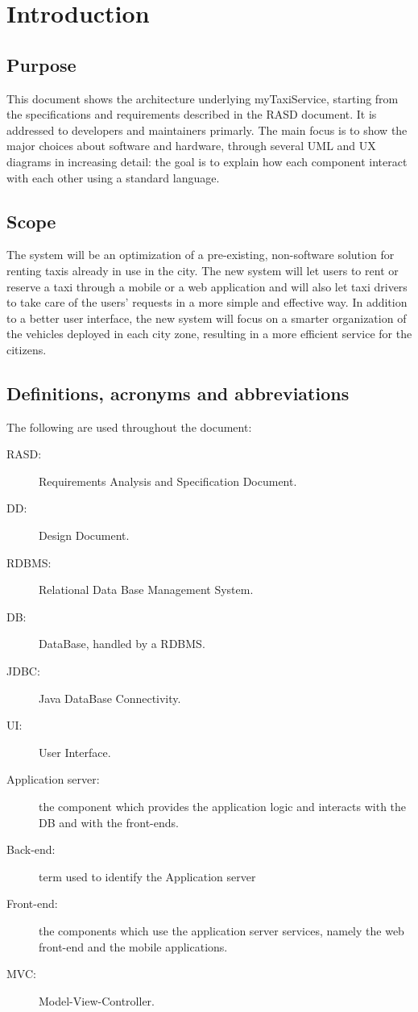 \section{Introduction}

\subsection{Purpose}
This document shows the architecture underlying myTaxiService, starting from the specifications and requirements described in the RASD document. It is addressed to developers and maintainers primarly. The main focus is to show the major choices about software and hardware, through several UML and UX diagrams in increasing detail: the goal is to explain how each component interact with each other using a standard language.

\subsection{Scope}
The system will be an optimization of a pre-existing, non-software solution for renting taxis already in use in the city. The new system will let users to rent or reserve a taxi through a mobile or a web application and will also let taxi drivers to take care of the users' requests in a more simple and effective way. In addition to a better user interface, the new system will focus on a smarter organization of the vehicles deployed in each city zone, resulting in a more efficient service for the citizens.

\subsection{Definitions, acronyms and abbreviations}
The following are used throughout the document:
\begin{description}
\item[RASD:] Requirements Analysis and Specification Document.
\item[DD:] Design Document.
\item[RDBMS:] Relational Data Base Management System.
\item[DB:] DataBase, handled by a RDBMS.
\item[JDBC:] Java DataBase Connectivity.
\item[UI:] User Interface.
\item[Application server:] the component which provides the application logic and interacts with the DB and with the front-ends.
\item[Back-end:] term used to identify the Application server
\item[Front-end:] the components which use the application server services, namely the web front-end and the mobile applications.
\item[MVC:] Model-View-Controller.
\end{description}

